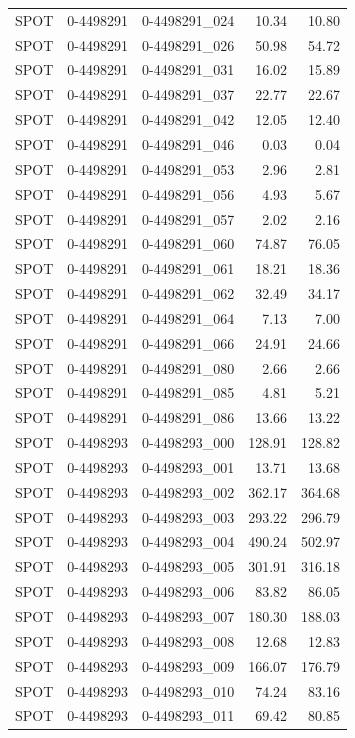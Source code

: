 \begin{tabular}{lllrr}
SPOT & 0-4498291 & 0-4498291_024 & 10.34 & 10.80 \\
SPOT & 0-4498291 & 0-4498291_026 & 50.98 & 54.72 \\
SPOT & 0-4498291 & 0-4498291_031 & 16.02 & 15.89 \\
SPOT & 0-4498291 & 0-4498291_037 & 22.77 & 22.67 \\
SPOT & 0-4498291 & 0-4498291_042 & 12.05 & 12.40 \\
SPOT & 0-4498291 & 0-4498291_046 & 0.03 & 0.04 \\
SPOT & 0-4498291 & 0-4498291_053 & 2.96 & 2.81 \\
SPOT & 0-4498291 & 0-4498291_056 & 4.93 & 5.67 \\
SPOT & 0-4498291 & 0-4498291_057 & 2.02 & 2.16 \\
SPOT & 0-4498291 & 0-4498291_060 & 74.87 & 76.05 \\
SPOT & 0-4498291 & 0-4498291_061 & 18.21 & 18.36 \\
SPOT & 0-4498291 & 0-4498291_062 & 32.49 & 34.17 \\
SPOT & 0-4498291 & 0-4498291_064 & 7.13 & 7.00 \\
SPOT & 0-4498291 & 0-4498291_066 & 24.91 & 24.66 \\
SPOT & 0-4498291 & 0-4498291_080 & 2.66 & 2.66 \\
SPOT & 0-4498291 & 0-4498291_085 & 4.81 & 5.21 \\
SPOT & 0-4498291 & 0-4498291_086 & 13.66 & 13.22 \\
SPOT & 0-4498293 & 0-4498293_000 & 128.91 & 128.82 \\
SPOT & 0-4498293 & 0-4498293_001 & 13.71 & 13.68 \\
SPOT & 0-4498293 & 0-4498293_002 & 362.17 & 364.68 \\
SPOT & 0-4498293 & 0-4498293_003 & 293.22 & 296.79 \\
SPOT & 0-4498293 & 0-4498293_004 & 490.24 & 502.97 \\
SPOT & 0-4498293 & 0-4498293_005 & 301.91 & 316.18 \\
SPOT & 0-4498293 & 0-4498293_006 & 83.82 & 86.05 \\
SPOT & 0-4498293 & 0-4498293_007 & 180.30 & 188.03 \\
SPOT & 0-4498293 & 0-4498293_008 & 12.68 & 12.83 \\
SPOT & 0-4498293 & 0-4498293_009 & 166.07 & 176.79 \\
SPOT & 0-4498293 & 0-4498293_010 & 74.24 & 83.16 \\
SPOT & 0-4498293 & 0-4498293_011 & 69.42 & 80.85 \\

\end{tabular}
